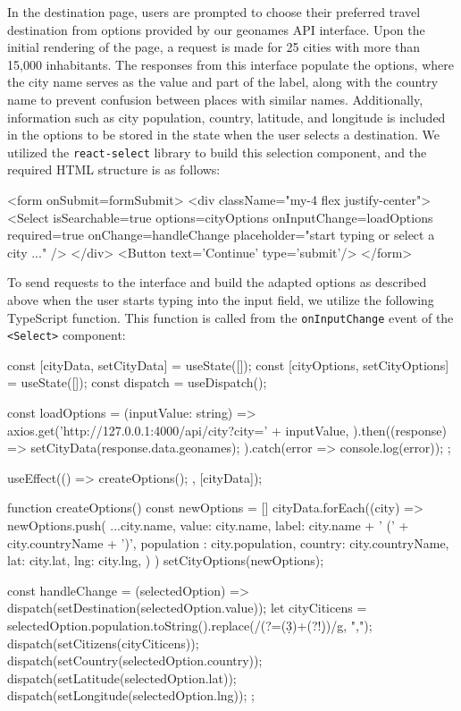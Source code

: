 \documentclass[english,notitlepage,smartquotes]{hgbreport}
\begin{document}
In the destination page, users are prompted to choose their preferred travel destination from options provided by our geonames API interface. Upon the initial rendering of the page, a request is made for 25 cities with more than 15,000 inhabitants. The responses from this interface populate the options, where the city name serves as the value and part of the label, along with the country name to prevent confusion between places with similar names. Additionally, information such as city population, country, latitude, and longitude is included in the options to be stored in the state when the user selects a destination. We utilized the \texttt{react-select} library to build this selection component, and the required HTML structure is as follows:

\begin{HtmlCode}
	<form onSubmit={formSubmit}>
		<div className="my-4 flex justify-center">
			<Select
				isSearchable={true}
				options={cityOptions}
				onInputChange={loadOptions}
				required={true}
				onChange={handleChange}
				placeholder="start typing or select a city ..."
			/>
		</div>
		<Button text='Continue' type='submit'/>
	</form>
\end{HtmlCode}

To send requests to the interface and build the adapted options as described above when the user starts typing into the input field, we utilize the following TypeScript function. This function is called from the \texttt{onInputChange} event of the \texttt{<Select>} component:

\begin{JsCode}
const [cityData, setCityData] = useState([]);
const [cityOptions, setCityOptions] = useState([]);
const dispatch = useDispatch();
	
const loadOptions = (inputValue: string) => {
	axios.get('http://127.0.0.1:4000/api/city?city=' + inputValue, {}).then((response) => {
		setCityData(response.data.geonames);
	}).catch(error => console.log(error));
};

useEffect(() => {
	createOptions();
}, [cityData]);

function createOptions() {
	const newOptions = []
	cityData.forEach((city) => {
		newOptions.push({
			...city.name,
			value: city.name,
			label: city.name + ' (' + city.countryName + ')',
			population : city.population,
			country: city.countryName,
			lat: city.lat,
			lng: city.lng,
		})
	})
	setCityOptions(newOptions);
}

const handleChange = (selectedOption) => {
	dispatch(setDestination(selectedOption.value));
	let cityCiticens = selectedOption.population.toString().replace(/\B(?=(\d{3})+(?!\d))/g, ",");
	dispatch(setCitizens(cityCiticens));
	dispatch(setCountry(selectedOption.country));
	dispatch(setLatitude(selectedOption.lat));
	dispatch(setLongitude(selectedOption.lng));
};
\end{JsCode}
\end{document}
